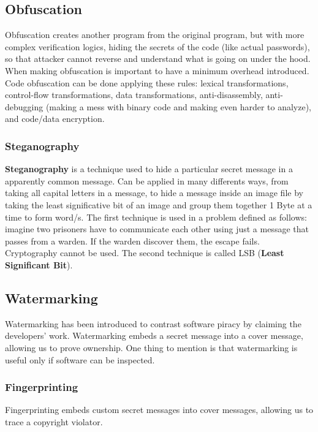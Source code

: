 \subsection{Obfuscation}
Obfuscation creates another program from the original program, but with more complex verification logics, hiding the secrets of the code (like actual passwords), so that attacker cannot reverse and understand what is going on under the hood. When making obfuscation is important to have a minimum overhead introduced. \newline
Code obfuscation can be done applying these rules: lexical transformations, control-flow transformations, data transformations, anti-disassembly, anti-debugging (making a mess with  binary code and making even harder to analyze), and code/data encryption. 

\subsubsection{Steganography}

\textbf{Steganography} is a technique used to hide a particular secret message in a apparently common message. Can be applied in many differents ways, from taking all capital letters in a message, to hide a message inside an image file by taking the least significative bit of an image and group them together 1 Byte at a time to form word/s. \newline  
The first technique is used in a problem defined as follows: imagine two prisoners have to communicate each other using just a message that passes from a warden. If the warden discover them, the escape fails. Cryptography cannot be used.\newline 
The second technique is called LSB (\textbf{Least Significant Bit}).

\subsection{Watermarking}

Watermarking has been introduced to contrast software piracy by claiming the developers' work. Watermarking embeds a secret message into a cover message, allowing us to prove ownership. \newline
One thing to mention is that watermarking is useful only if software can be inspected. 

\subsubsection{Fingerprinting}
Fingerprinting embeds custom secret messages into cover messages, allowing us to trace a copyright violator. 

